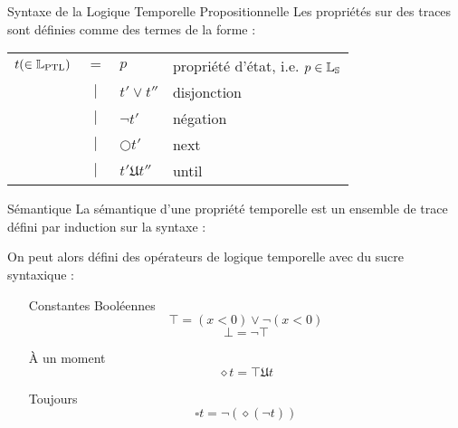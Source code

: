 \documentclass{cours}
\begin{document}
\begin{définition}{Syntaxe de la Logique Temporelle Propositionnelle}{}
    Les propriétés sur des traces sont définies comme des termes de la forme : 
    \begin{tabular}{rcll}
        $t(\in \mathbb{L}_{\rm PTL})$ & $=$ & $p$ & propriété d'état, i.e. $p \in \mathbb{L}_{\mathbb{S}}$\\
        & $\mid$ & $t' \lor t''$ & disjonction \\
        & $\mid$ & $\lnot t'$ & négation\\
        & $\mid$ & $\bigcirc t'$ & next\\
        & $\mid$ & $t' \mathfrak{U} t''$ & until
    \end{tabular}
\end{définition}

\begin{définition}{Sémantique}{}
    La sémantique d'une propriété temporelle est un ensemble de trace défini par induction sur la syntaxe : 
\end{définition}

On peut alors défini des opérateurs de logique temporelle avec du sucre syntaxique : 
\begin{itemize}
    \item[Constantes Booléennes] 
    \[
        \top = (x < 0) \lor \lnot (x < 0)
    \] 
    \[
        \bot = \lnot \top
    \]
    \item[À un moment]
    \[
        \diamond t = \top \mathfrak{U} t
    \]
    \item[Toujours]
    \[
        \square t = \lnot\left(\diamond \left(\lnot t\right)\right)
    \]
\end{itemize}
\end{document}
